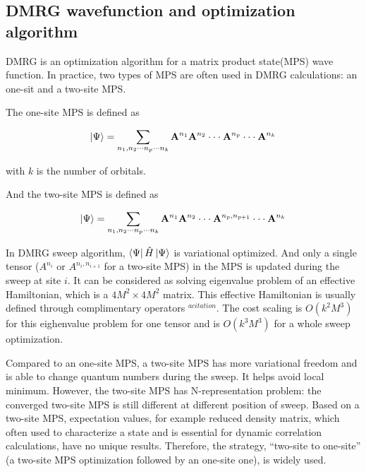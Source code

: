 
\subsection{DMRG wavefunction and optimization algorithm}

DMRG is an optimization algorithm for a matrix product state(MPS) wave function. In practice, two types of MPS are often used in DMRG calculations: an one-sit and a two-site MPS. 

The one-site MPS is defined as

\begin{equation}
  \ket{\Psi}= \sum_{\substack{n_1, n_2\cdot\cdot\cdot n_p\cdot\cdot\cdot n_k}} {\bf A}^{n_1}{\bf A}^{n_2}\cdot\cdot\cdot {\bf A}^{n_{p}} \cdot\cdot\cdot{\bf A}^{n_k}
\end{equation}

with $k$ is the number of orbitals.

And the two-site MPS is defined as

\begin{equation}
  \ket{\Psi}= \sum_{\substack{n_1, n_2\cdot\cdot\cdot n_p\cdot\cdot\cdot n_k}} {\bf A}^{n_1}{\bf A}^{n_2}\cdot\cdot\cdot {\bf A}^{n_{p},n_{p+1}} \cdot\cdot\cdot{\bf A}^{n_k}
\end{equation}

In DMRG sweep algorithm, $\bra{\Psi}\hat{H}\ket{\Psi}$ is variational optimized. And only a single tensor ($A^{n_i}$ or $A^{n_i, n_{i+1}}$ for a two-site MPS) in the MPS is updated during the sweep at site $i$. It can be considered as solving eigenvalue problem of an effective Hamiltonian, which is a $4M^2\times 4M^2$ matrix. This effective Hamiltonian is usually defined through complimentary operators $^{a citation} $. The cost scaling is $O(k^2M^3)$ for this eighenvalue problem for one tensor and is $O(k^3M^3)$ for a whole sweep optimization. 

Compared to an one-site MPS, a two-site MPS has more variational freedom and is able to change quantum numbers during the sweep. It helps avoid local minimum. However, the two-site MPS has N-representation problem: the converged two-site MPS is still different at different position of sweep. Based on a two-site MPS, expectation values, for example reduced density matrix, which often used to characterize a state and is essential for dynamic correlation calculations, have no unique results. 
Therefore, the strategy, ``two-site to one-site'' (a two-site MPS optimization followed by an one-site one), is widely used. 
















